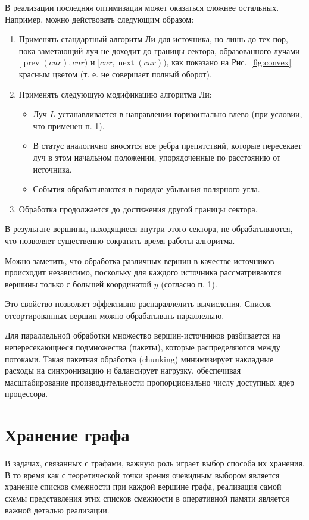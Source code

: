 \documentclass{article}
\theoremstyle{definition}
\begin{document}
В реализации последняя оптимизация может оказаться сложнее остальных.
Например, можно действовать следующим образом:
\begin{enumerate}
   \item Применять стандартный алгоритм Ли для источника, но лишь до тех пор, пока заметающий луч не доходит до границы сектора,
       образованного лучами $[\operatorname{prev}(cur), cur)$ и $[cur, \operatorname{next}(cur))$, 
       как показано на Рис.~\ref{fig:convex} красным цветом (т. е. не совершает полный оборот).
    \item Применять следующую модификацию алгоритма Ли:
        \begin{itemize}
            \item Луч $L$ устанавливается в направлении горизонтально влево (при условии, что применен п. 1).
            \item В статус аналогично вносятся все ребра препятствий, которые пересекает луч в этом начальном положении,
                  упорядоченные по расстоянию от источника.
            \item События обрабатываются в порядке убывания полярного угла.
        \end{itemize}
    \item Обработка продолжается до достижения другой границы сектора.
\end{enumerate}
В результате вершины, находящиеся внутри этого сектора, не обрабатываются, что позволяет существенно
сократить время работы алгоритма.

Можно заметить, что обработка различных вершин в качестве источников происходит независимо, 
поскольку для каждого источника рассматриваются вершины только с большей координатой $y$ (согласно п. 1). 

Это свойство позволяет эффективно распараллелить вычисления. Список отсортированных вершин можно обрабатывать параллельно. 

Для параллельной обработки множество вершин-источников разбивается на непересекающиеся подмножества (пакеты),
которые распределяются между потоками. Такая пакетная обработка (chunking) минимизирует накладные расходы на
синхронизацию и балансирует нагрузку, обеспечивая масштабирование производительности пропорционально числу доступных ядер процессора.
\section{Хранение графа}

В задачах, связанных с графами, важную роль играет выбор способа их хранения.
В то время как с теоретической точки зрения очевидным выбором является
хранение списков смежности при каждой вершине графа, реализация самой
схемы представления этих списков смежности в оперативной памяти
является важной деталью реализации.
\end{document}
